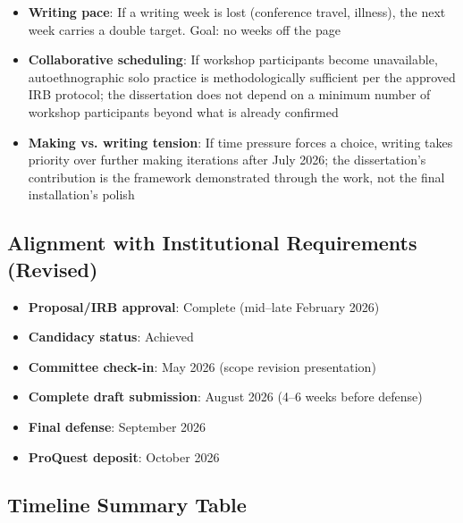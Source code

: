 \begin{itemize}[noitemsep]
	\item \textbf{Writing pace}: If a writing week is lost (conference travel, illness), the next week carries a double target. Goal: no weeks off the page
	\item \textbf{Collaborative scheduling}: If workshop participants become unavailable, autoethnographic solo practice is methodologically sufficient per the approved IRB protocol; the dissertation does not depend on a minimum number of workshop participants beyond what is already confirmed
	\item \textbf{Making vs. writing tension}: If time pressure forces a choice, writing takes priority over further making iterations after July 2026; the dissertation's contribution is the framework demonstrated through the work, not the final installation's polish
\end{itemize}

\subsection*{Alignment with Institutional Requirements (Revised)}

\begin{itemize}[noitemsep]
	\item \textbf{Proposal/IRB approval}: Complete (mid–late February 2026)
	\item \textbf{Candidacy status}: Achieved
	\item \textbf{Committee check-in}: May 2026 (scope revision presentation)
	\item \textbf{Complete draft submission}: August 2026 (4–6 weeks before defense)
	\item \textbf{Final defense}: September 2026
	\item \textbf{ProQuest deposit}: October 2026
\end{itemize}

\subsection*{Timeline Summary Table}

